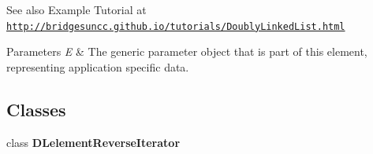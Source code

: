 \begin{DoxySeeAlso}{See also}
Example Tutorial at ~\newline
 \href{http://bridgesuncc.github.io/tutorials/DoublyLinkedList.html}{\tt http\+://bridgesuncc.\+github.\+io/tutorials/\+Doubly\+Linked\+List.\+html}
\end{DoxySeeAlso}

\begin{DoxyParams}{Parameters}
{\em E} & The generic parameter object that is part of this element, representing application specific data. \\
\hline
\end{DoxyParams}
\subsection*{Classes}
\begin{DoxyCompactItemize}
\item 
class {\bfseries D\+Lelement\+Reverse\+Iterator}
\end{DoxyCompactItemize}
